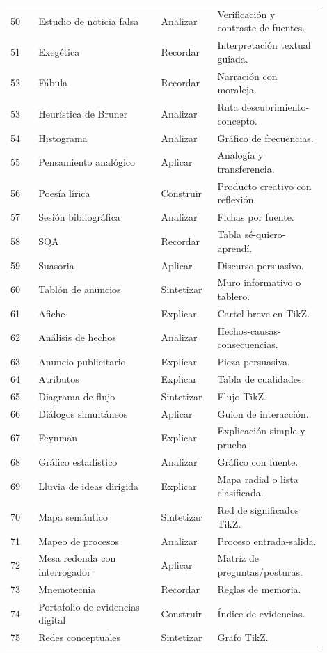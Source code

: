 \begin{longtable}{@{}p{0.08\linewidth}p{0.35\linewidth}p{0.16\linewidth}p{0.31\linewidth}@{}}
50 & Estudio de noticia falsa & Analizar & Verificación y contraste de fuentes. \\
51 & Exegética & Recordar & Interpretación textual guiada. \\
52 & Fábula & Recordar & Narración con moraleja. \\
53 & Heurística de Bruner & Analizar & Ruta descubrimiento-concepto. \\
54 & Histograma & Analizar & Gráfico de frecuencias. \\
55 & Pensamiento analógico & Aplicar & Analogía y transferencia. \\
56 & Poesía lírica & Construir & Producto creativo con reflexión. \\
57 & Sesión bibliográfica & Analizar & Fichas por fuente. \\
58 & SQA & Recordar & Tabla sé-quiero-aprendí. \\
59 & Suasoria & Aplicar & Discurso persuasivo. \\
60 & Tablón de anuncios & Sintetizar & Muro informativo o tablero. \\
61 & Afiche & Explicar & Cartel breve en TikZ. \\
62 & Análisis de hechos & Analizar & Hechos-causas-consecuencias. \\
63 & Anuncio publicitario & Explicar & Pieza persuasiva. \\
64 & Atributos & Explicar & Tabla de cualidades. \\
65 & Diagrama de flujo & Sintetizar & Flujo TikZ. \\
66 & Diálogos simultáneos & Aplicar & Guion de interacción. \\
67 & Feynman & Explicar & Explicación simple y prueba. \\
68 & Gráfico estadístico & Analizar & Gráfico con fuente. \\
69 & Lluvia de ideas dirigida & Explicar & Mapa radial o lista clasificada. \\
70 & Mapa semántico & Sintetizar & Red de significados TikZ. \\
71 & Mapeo de procesos & Analizar & Proceso entrada-salida. \\
72 & Mesa redonda con interrogador & Aplicar & Matriz de preguntas/posturas. \\
73 & Mnemotecnia & Recordar & Reglas de memoria. \\
74 & Portafolio de evidencias digital & Construir & Índice de evidencias. \\
75 & Redes conceptuales & Sintetizar & Grafo TikZ. \\

\end{longtable}
